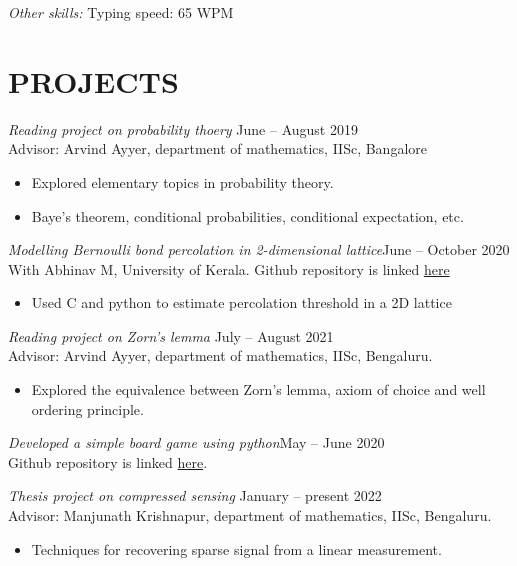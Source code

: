 \documentclass[margin, 10pt]{res} %
\begin{document}
\begin{resume}
{\sl Other skills:} Typing speed: 65 WPM
 
 
\section{PROJECTS}

{\sl Reading project on probability thoery} \hfill June -- August 2019 \\
Advisor: Arvind Ayyer, department of mathematics, IISc, Bangalore
\begin{itemize} \itemsep -2pt %
\item Explored elementary topics in probability theory.
\item Baye's theorem, conditional probabilities, conditional expectation, etc.
\end{itemize}
\smallskip

{\sl Modelling Bernoulli bond percolation in 2-dimensional lattice}\hfill June -- October 2020\\
	With Abhinav M, University of Kerala. Github repository is linked \href{https://github.com/AbhinavM2000/percolation_}{here}
\begin{itemize}
	\item Used C and python to estimate percolation threshold in a 2D lattice
\end{itemize}
\smallskip

{\sl Reading project on Zorn's lemma} \hfill July -- August 2021 \\
Advisor: Arvind Ayyer, department of mathematics, IISc, Bengaluru.
\begin{itemize} 
\item Explored the equivalence between Zorn's lemma, axiom of choice and well ordering principle.
\end{itemize} 
\smallskip

{\sl Developed a simple board game using python}\hfill May -- June 2020\\
Github repository is linked \href{https://github.com/DhanusML/marble-and-hole-puzzle}{here}.
\smallskip

{\sl Thesis project on compressed sensing} \hfill  January -- present 2022\\
Advisor: Manjunath Krishnapur, department of mathematics, IISc, Bengaluru.
\begin{itemize} \itemsep -2pt
\item Techniques for recovering sparse signal from a linear measurement.
\end{itemize} 


\end{resume}
\end{document}
